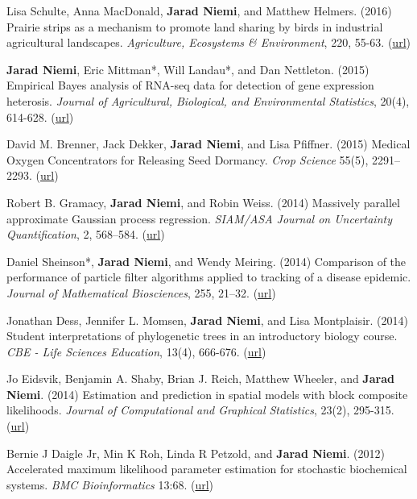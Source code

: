 \documentclass[overlapped,line]{res}
\begin{document}
\begin{resume}
Lisa Schulte, Anna MacDonald, {\bf Jarad Niemi}, and Matthew Helmers. (2016) Prairie strips as a mechanism to promote land sharing by birds in industrial agricultural landscapes. \emph{Agriculture, Ecosystems \& Environment}, 220, 55-63. (\href{http://www.sciencedirect.com/science/article/pii/S016788091630007X}{url})

{\bf Jarad Niemi}, Eric Mittman*, Will Landau*, and Dan Nettleton. (2015) Empirical Bayes analysis of RNA-seq data for detection of gene expression heterosis. \emph{Journal of Agricultural, Biological, and Environmental Statistics}, 20(4), 614-628. (\href{http://link.springer.com/article/10.1007%2Fs13253-015-0230-5}{url})



David M. Brenner, Jack Dekker, {\bf Jarad Niemi}, and Lisa Pfiffner. (2015) Medical Oxygen Concentrators for Releasing Seed Dormancy. \emph{Crop Science} 55(5), 2291--2293. (\href{https://dl.sciencesocieties.org/publications/cs/pdfs/0/0/cropsci2014.11.0783}{url})

Robert B. Gramacy, {\bf Jarad Niemi}, and Robin Weiss. (2014) Massively parallel approximate Gaussian process regression. \emph{SIAM/ASA Journal on Uncertainty Quantification}, 2, 568--584. (\href{http://epubs.siam.org/doi/abs/10.1137/130941912}{url})

Daniel Sheinson*, {\bf Jarad Niemi}, and Wendy Meiring. (2014) Comparison of the performance of particle filter algorithms applied to tracking of a disease epidemic. \emph{Journal of Mathematical Biosciences}, 255, 21--32. (\href{http://www.sciencedirect.com/science/article/pii/S0025556414001242}{url})

Jonathan Dess, Jennifer L. Momsen, {\bf Jarad Niemi}, and Lisa Montplaisir. (2014) Student interpretations of phylogenetic trees in an introductory biology course. \emph{CBE - Life Sciences Education}, 13(4), 666-676. (\href{http://www.lifescied.org/content/13/4/666.full?sid=7d54efe2-73cc-4823-b359-0ec4066c4e5b}{url})

Jo Eidsvik, Benjamin A. Shaby, Brian J. Reich, Matthew Wheeler, and {\bf Jarad Niemi}. (2014) Estimation and prediction in spatial models with block composite likelihoods. \emph{Journal of Computational and Graphical Statistics}, 23(2), 295-315. (\href{http://amstat.tandfonline.com/doi/abs/10.1080/10618600.2012.760460}{url})


Bernie J Daigle Jr, Min K Roh, Linda R Petzold, and {\bf Jarad Niemi}. (2012) Accelerated maximum likelihood parameter estimation for stochastic biochemical systems. \emph{BMC Bioinformatics} 13:68. (\href{http://www.biomedcentral.com/1471-2105/13/68}{url})


\end{resume}
\end{document}
